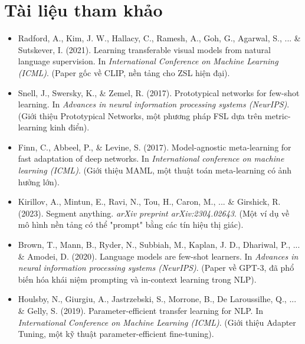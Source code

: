 \section*{Tài liệu tham khảo}
\begin{itemize}
	\item[1] Radford, A., Kim, J. W., Hallacy, C., Ramesh, A., Goh, G., Agarwal, S., ... \& Sutskever, I. (2021). Learning transferable visual models from natural language supervision. In \textit{International Conference on Machine Learning (ICML)}. (Paper gốc về CLIP, nền tảng cho ZSL hiện đại).
	\item[2] Snell, J., Swersky, K., \& Zemel, R. (2017). Prototypical networks for few-shot learning. In \textit{Advances in neural information processing systems (NeurIPS)}. (Giới thiệu Prototypical Networks, một phương pháp FSL dựa trên metric-learning kinh điển).
	\item[3] Finn, C., Abbeel, P., \& Levine, S. (2017). Model-agnostic meta-learning for fast adaptation of deep networks. In \textit{International conference on machine learning (ICML)}. (Giới thiệu MAML, một thuật toán meta-learning có ảnh hưởng lớn).
	\item[4] Kirillov, A., Mintun, E., Ravi, N., Tou, H., Caron, M., ... \& Girshick, R. (2023). Segment anything. \textit{arXiv preprint arXiv:2304.02643}. (Một ví dụ về mô hình nền tảng có thể "prompt" bằng các tín hiệu thị giác).
	\item[5] Brown, T., Mann, B., Ryder, N., Subbiah, M., Kaplan, J. D., Dhariwal, P., ... \& Amodei, D. (2020). Language models are few-shot learners. In \textit{Advances in neural information processing systems (NeurIPS)}. (Paper về GPT-3, đã phổ biến hóa khái niệm prompting và in-context learning trong NLP).
	\item[6] Houlsby, N., Giurgiu, A., Jastrzebski, S., Morrone, B., De Laroussilhe, Q., ... \& Gelly, S. (2019). Parameter-efficient transfer learning for NLP. In \textit{International Conference on Machine Learning (ICML)}. (Giới thiệu Adapter Tuning, một kỹ thuật parameter-efficient fine-tuning).
\end{itemize}